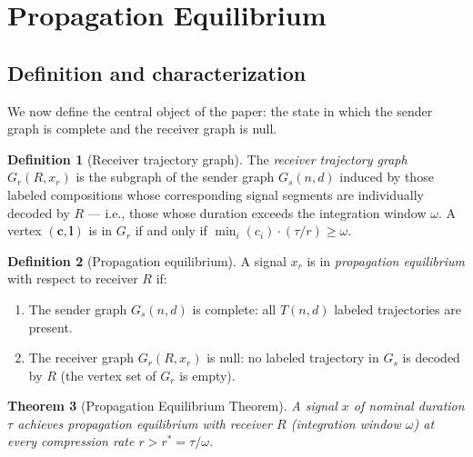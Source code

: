 \documentclass[twocolumn,11pt,a4paper]{article}
\theoremstyle{main}
\newtheorem{theorem}{Theorem}[section]
\theoremstyle{definition}
\newtheorem{definition}[theorem]{Definition}
\theoremstyle{remark}
\newcommand{\Recv}{R}
\newcommand{\Traj}{T}
\newcommand{\rate}{r}
\newcommand{\window}{\omega}
\begin{document}
\section{Propagation Equilibrium}
\label{sec:equilibrium}

\subsection{Definition and characterization}

We now define the central object of the paper: the state in which the
sender graph is complete and the receiver graph is null.

\begin{definition}[Receiver trajectory graph]
\label{def:receivergraph}
The \emph{receiver trajectory graph} $G_r(\Recv, x_\rate)$ is the
subgraph of the sender graph $G_s(n,d)$ induced by those labeled
compositions whose corresponding signal segments are individually
decoded by $\Recv$ --- i.e., those whose duration exceeds the
integration window $\window$. A vertex $(\mathbf{c}, \mathbf{l})$ is
in $G_r$ if and only if $\min_i(c_i) \cdot (\tau/\rate) \geq \window$.
\end{definition}

\begin{definition}[Propagation equilibrium]
\label{def:equil}
A signal $x_\rate$ is in \emph{propagation equilibrium} with respect to
receiver $\Recv$ if:
\begin{enumerate}[label=(\roman*), leftmargin=1.8em, itemsep=1pt]
\item The sender graph $G_s(n,d)$ is complete: all $\Traj(n,d)$
  labeled trajectories are present.
\item The receiver graph $G_r(\Recv, x_\rate)$ is null: no labeled
  trajectory in $G_s$ is decoded by $\Recv$ (the vertex set of $G_r$
  is empty).
\end{enumerate}
\end{definition}

\begin{theorem}[Propagation Equilibrium Theorem]
\label{thm:equil}
A signal $x$ of nominal duration $\tau$ achieves propagation equilibrium
with receiver $\Recv$ (integration window $\window$) at every
compression rate $\rate > \rate^* = \tau / \window$.
\end{theorem}
\end{document}
